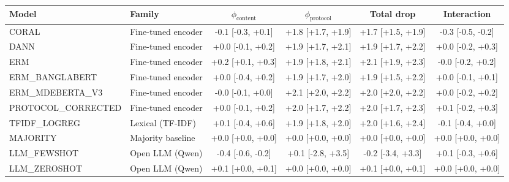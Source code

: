 \begin{tabular}{llcccc}
\toprule
Model & Family & $\phi_{\text{content}}$ & $\phi_{\text{protocol}}$ & Total drop & Interaction \\
\midrule
CORAL & Fine-tuned encoder & -0.1 [-0.3, +0.1] & +1.8 [+1.7, +1.9] & +1.7 [+1.5, +1.9] & -0.3 [-0.5, -0.2] \\
DANN & Fine-tuned encoder & +0.0 [-0.1, +0.2] & +1.9 [+1.7, +2.1] & +1.9 [+1.7, +2.2] & +0.0 [-0.2, +0.3] \\
ERM & Fine-tuned encoder & +0.2 [+0.1, +0.3] & +1.9 [+1.8, +2.1] & +2.1 [+1.9, +2.3] & -0.0 [-0.2, +0.2] \\
ERM\_BANGLABERT & Fine-tuned encoder & +0.0 [-0.4, +0.2] & +1.9 [+1.7, +2.0] & +1.9 [+1.5, +2.2] & +0.0 [-0.1, +0.1] \\
ERM\_MDEBERTA\_V3 & Fine-tuned encoder & -0.0 [-0.1, +0.0] & +2.1 [+2.0, +2.2] & +2.0 [+2.0, +2.2] & +0.0 [-0.2, +0.2] \\
PROTOCOL\_CORRECTED & Fine-tuned encoder & +0.0 [-0.1, +0.2] & +2.0 [+1.7, +2.2] & +2.0 [+1.7, +2.3] & +0.1 [-0.2, +0.3] \\
TFIDF\_LOGREG & Lexical (TF-IDF) & +0.1 [-0.4, +0.6] & +1.9 [+1.8, +2.0] & +2.0 [+1.6, +2.4] & -0.1 [-0.4, +0.0] \\
MAJORITY & Majority baseline & +0.0 [+0.0, +0.0] & +0.0 [+0.0, +0.0] & +0.0 [+0.0, +0.0] & +0.0 [+0.0, +0.0] \\
LLM\_FEWSHOT & Open LLM (Qwen) & -0.4 [-0.6, -0.2] & +0.1 [-2.8, +3.5] & -0.2 [-3.4, +3.3] & +0.1 [-0.3, +0.6] \\
LLM\_ZEROSHOT & Open LLM (Qwen) & +0.1 [+0.0, +0.1] & +0.0 [+0.0, +0.0] & +0.1 [+0.0, +0.1] & +0.0 [+0.0, +0.0] \\
\bottomrule
\end{tabular}